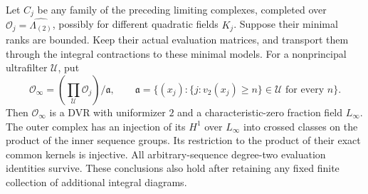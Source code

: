 \begin{proposition}
\label{rl:outer-evaluation}
Let $C_j$ be any family of the preceding limiting complexes, completed
over $\mathcal O_j=\widehat{\Lambda_{(2)}}$, possibly for different
quadratic fields $K_j$.  Suppose their minimal ranks are bounded.
Keep their actual evaluation matrices, and transport them through the
integral contractions to these minimal models.  For a nonprincipal
ultrafilter $\mathcal U$, put
\[
 \mathcal O_\infty=
 \left(\prod_{\mathcal U}\mathcal O_j\right)/\mathfrak a,
 \qquad
 \mathfrak a=\{(x_j):
    \{j:v_2(x_j)\geq n\}\in\mathcal U\text{ for every }n\}.
\]
Then $\mathcal O_\infty$ is a DVR with uniformizer $2$ and a
characteristic-zero fraction field $L_\infty$.  The outer complex has
an injection of its $H^1$ over $L_\infty$ into crossed classes on the
product of the inner sequence groups.  Its restriction to the product
of their exact common kernels is injective.  All arbitrary-sequence
degree-two evaluation identities survive.  These conclusions also
hold after retaining any fixed finite collection of additional
integral diagrams.
\end{proposition}


